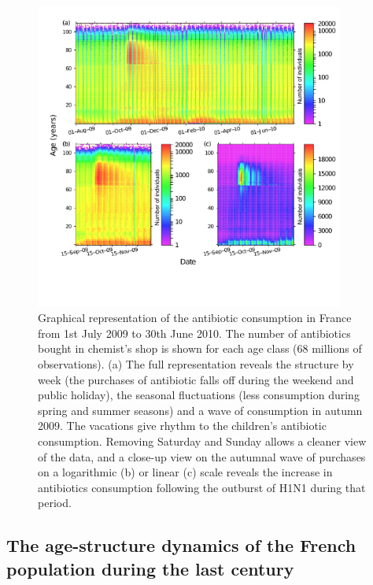 \begin{figure}[!ht] %
\centering
\includegraphics[width=0.9\textwidth]{2_Methodo/Fig/05}
\caption[Antibiotic consumption in France]{ Graphical
representation of the antibiotic consumption in France from 1st July 2009 to
30th June 2010. The number of antibiotics bought in chemist’s shop is shown for
each age class (68 millions of observations). (a) The full representation
reveals the structure by week (the purchases of antibiotic falls off during the
weekend and public holiday), the seasonal fluctuations (less consumption during
spring and summer seasons) and a wave of consumption in autumn 2009. The
vacations give rhythm to the children’s antibiotic consumption. Removing
Saturday and Sunday allows a cleaner view of the data, and a close-up view on
the autumnal wave of purchases on a logarithmic (b) or linear (c) scale reveals
the increase in antibiotics consumption following the outburst of H1N1 during
that period. }
\label{fig:ASTd5}
\end{figure}

\subsection{The age-structure dynamics of the French population during the last
century}

